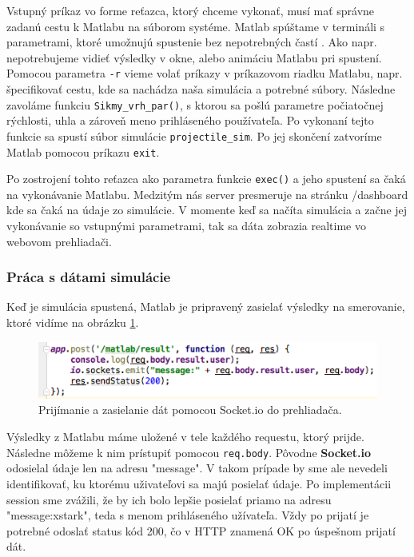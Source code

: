 Vstupný príkaz vo forme reťazca, ktorý chceme vykonať, musí mať správne zadanú cestu k Matlabu na súborom systéme. Matlab spúštame v termináli s parametrami, ktoré umožnujú spustenie bez nepotrebných častí \cite{matlab-macos}. Ako napr. nepotrebujeme vidieť výsledky v okne, alebo animáciu Matlabu pri spustení. Pomocou parametra \verb|-r| vieme volať príkazy v príkazovom riadku Matlabu, napr. špecifikovať cestu, kde sa nachádza naša simulácia a potrebné súbory. Následne zavoláme funkciu \verb|Sikmy_vrh_par()|, s ktorou sa pošlú parametre počiatočnej rýchlosti, uhla a zároveň meno prihláseného používateľa. Po vykonaní tejto funkcie sa spustí súbor simulácie \verb|projectile_sim|. Po jej skončení zatvoríme Matlab pomocou príkazu \verb|exit|.

Po zostrojení tohto reťazca ako parametra funkcie \verb|exec()| a jeho spustení sa čaká na vykonávanie Matlabu. Medzitým nás server presmeruje na stránku /dashboard kde sa čaká na údaje zo simulácie. V momente keď sa načíta simulácia a začne jej vykonávanie so vstupnými parametrami, tak sa dáta zobrazia realtime vo webovom prehliadači.

\subsubsection{Práca s dátami simulácie}
Keď je simulácia spustená, Matlab je pripravený zasielať výsledky na smerovanie, ktoré vidíme na obrázku \ref{img-express-socketio}. 

\begin{figure}[H]
  \centering
  \includegraphics[scale=0.7]{img/code/express-socketio.png}
  \caption{Prijímanie a zasielanie dát pomocou Socket.io do prehliadača.}
  \label{img-express-socketio}
\end{figure}

Výsledky z Matlabu máme uložené v tele každého requestu, ktorý prijde. Následne môžeme k nim prístupiť pomocou \verb|req.body|. Pôvodne \textbf{Socket.io} odosielal údaje len na adresu "message". V takom prípade by sme ale nevedeli identifikovať, ku ktorému uživateľovi sa majú posielať údaje. Po implementácii session sme zvážili, že by ich bolo lepšie posielať priamo na adresu "message:xstark", teda s menom prihláseného užívateľa. Vždy po prijatí je potrebné odoslať status kód 200, čo v HTTP znamená OK po úspešnom prijatí dát.


